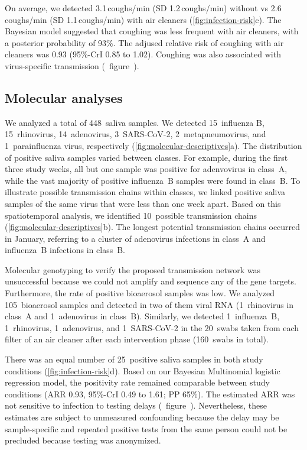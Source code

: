 \documentclass[fleqn,11pt]{wlscirep}
\begin{document}
On average, we detected 3.1\,coughs/min (SD 1.2\,coughs/min) without vs 2.6\,coughs/min (SD 1.1\,coughs/min) with air cleaners (\cref{fig:infection-risk}c). The Bayesian model suggested that coughing was less frequent with air cleaners, with a posterior probability of 93\%. The adjused relative risk of coughing with air cleaners was 0.93 (95\%-CrI 0.85 to 1.02). Coughing was also associated with virus-specific transmission (\supp~figure~).

\subsection*{Molecular analyses}

We analyzed a total of 448~saliva samples. We detected 15~influenza B, 15~rhinovirus, 14~adenovirus, 3~SARS-CoV-2, 2~metapneumovirus, and 1~parainfluenza virus, respectively (\cref{fig:molecular-descriptives}a). The distribution of positive saliva samples varied between classes. For example, during the first three study weeks, all but one sample was positive for adenvovirus in class~A, while the vast majority of positive influenza~B samples were found in class~B. To illustrate possible transmission chains within classes, we linked positive saliva samples of the same virus that were less than one week apart. Based on this spatiotemporal analysis, we identified 10~possible transmission chains (\cref{fig:molecular-descriptives}b). The longest potential transmission chains occurred in January, referring to a cluster of adenovirus infections in class~A and influenza~B infections in class~B. 

Molecular genotyping to verify the proposed transmission network was unsuccessful because we could not amplify and sequence any of the gene targets. Furthermore, the rate of positive bioaerosol samples was low. We analyzed 105~bioaerosol samples and detected in two of them viral RNA (1~rhinovirus in class~A and 1~adenovirus in class~B). Similarly, we detected 1~influenza~B, 1~rhinovirus, 1~adenovirus, and 1~SARS-CoV-2 in the 20~swabs taken from each filter of an air cleaner after each intervention phase (160~swabs in total). 

There was an equal number of 25~positive saliva samples in both study conditions (\cref{fig:infection-risk}d). Based on our Bayesian Multinomial logistic regression model, the positivity rate remained comparable between study conditions (ARR 0.93, 95\%-CrI 0.49 to 1.61; PP 65\%). The estimated ARR was not sensitive to infection to testing delays (\supp~figure~). Nevertheless, these estimates are subject to unmeasured confounding because the delay may be sample-specific and repeated positive tests from the same person could not be precluded because testing was anonymized.
\end{document}
